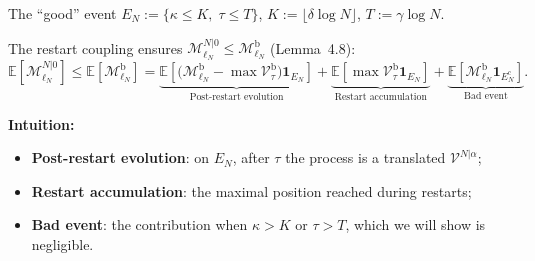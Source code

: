 
\small
\begin{block}{The ``good'' event}
    $E_N:=\{\kappa\le K,\;\tau\le T\}$, \quad
    $K:=\lfloor\delta\log N\rfloor$, \quad
    $T:=\gamma\log N$.
\end{block}

\vspace{-1mm}
The restart coupling ensures $\mathcal{M}_{\ell_N}^{N|0}\le\mathcal{M}_{\ell_N}^{\mathrm{b}}$ (Lemma~4.8):
\[
    \mathbb{E}\!\left[\mathcal{M}_{\ell_N}^{N|0}\right]
    \le
    \mathbb{E}\!\left[\mathcal{M}_{\ell_N}^{\mathrm{b}}\right]
    =
    \underbrace{\mathbb{E}\!\left[
        \bigl(\mathcal{M}_{\ell_N}^{\mathrm{b}}-\max\mathcal{V}^{\mathrm{b}}_\tau\bigr)
        \mathbf{1}_{E_N}
    \right]}_{\text{Post-restart evolution}}
    +
    \underbrace{\mathbb{E}\!\left[
        \max\mathcal{V}^{\mathrm{b}}_\tau\mathbf{1}_{E_N}
    \right]}_{\text{Restart accumulation}}
    +
    \underbrace{\mathbb{E}\!\left[
        \mathcal{M}_{\ell_N}^{\mathrm{b}}\mathbf{1}_{E_N^{\mathrm{c}}}
    \right]}_{\text{Bad event}}.
\]

\vspace{2mm}
\textbf{Intuition:}
\begin{itemize}
    \item \textbf{Post-restart evolution}: on $E_N$, after $\tau$ the process is a translated $\mathcal{V}^{N|\alpha}$;
    \item \textbf{Restart accumulation}: the maximal position reached during restarts;
    \item \textbf{Bad event}: the contribution when $\kappa>K$ or $\tau>T$, which we will show is negligible.
\end{itemize}
